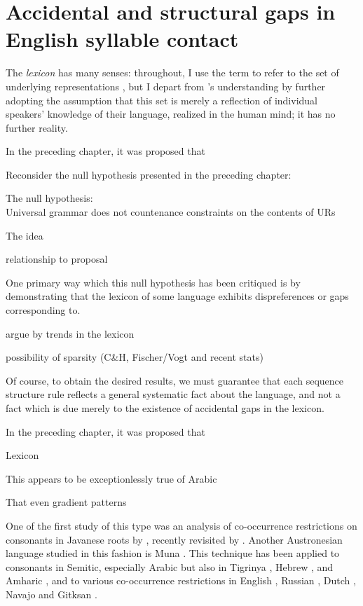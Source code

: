 \chapter{Accidental and structural gaps in English syllable contact}
\label{clusters}

The \emph{lexicon} has many senses: throughout, I use the term to refer to the set of underlying representations \citep[][269]{LANGUAGE}, but I depart from \citeauthor{LANGUAGE}'s understanding by further adopting the assumption that this set is merely a reflection of individual speakers' knowledge of their language, realized in the human mind; it has no further reality.



In the preceding chapter, it was proposed that 

Reconsider the null hypothesis presented in the preceding chapter:

\ex The null hypothesis: \\
Universal grammar does not countenance constraints on the contents of URs
\xe

The idea 

relationship to proposal

One primary way which this null hypothesis has been critiqued is by demonstrating that the lexicon of some language 
exhibits dispreferences or gaps corresponding to.

argue by trends in the lexicon

possibility of sparsity (C\&H, Fischer/Vogt and recent stats)

Of course, to obtain the desired results, we must guarantee that each sequence structure rule reflects a general systematic fact about the language, and not a fact which is due merely to the existence of accidental gaps in the lexicon. \citep[][401, fn.~8]{Stanley1967}

In the preceding chapter, it was proposed that 

Lexicon

This appears to be exceptionlessly true of Arabic

That even gradient patterns 

One of the first study of this type was an analysis of co-occurrence restrictions on consonants in Javanese roots by \citet{Mester1988}, recently revisited by \citet{Graff2011}. 
Another Austronesian language studied in this fashion is Muna \citep{Coetzee2008a,Anttila2008}.
This technique has been applied to consonants in Semitic, especially Arabic \citep{McCarthy1988,McCarthy1994,Pierrehumbert1993,Frisch1996,Frisch2004,Coetzee2008a} but also in Tigrinya \citep{Buckley1997}, Hebrew \citep{Berent2003}, and Amharic \citep{Colavin2010}, and to various co-occurrence restrictions in English \citep{Berkley1994b,Berkley1994a,Pierrehumbert1994,Dmitrieva2008a,Dmitrieva2008b,Coetzee2008b}, Russian \citep{Padgett1992}, Dutch \citep{Graff2011}, Navajo \citep{Martin2007,Martin2011} and Gitksan \citep{Brown2010}.

